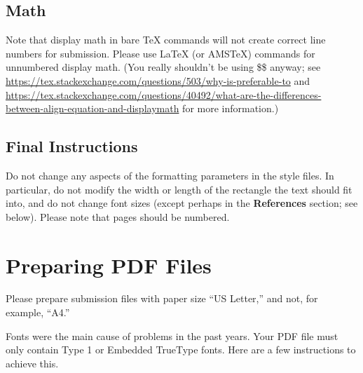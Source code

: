 \documentclass{article}
\begin{document}
\subsection{Math}
Note that display math in bare TeX commands will not create correct line numbers for submission. Please use LaTeX (or AMSTeX) commands for unnumbered display math. (You really shouldn't be using \$\$ anyway; see \url{https://tex.stackexchange.com/questions/503/why-is-preferable-to} and \url{https://tex.stackexchange.com/questions/40492/what-are-the-differences-between-align-equation-and-displaymath} for more information.)

\subsection{Final Instructions}

Do not change any aspects of the formatting parameters in the style files.  In particular, do not modify the width or length of the rectangle the text should fit into, and do not change font sizes (except perhaps in the \textbf{References} section; see below). Please note that pages should be numbered.

\section{Preparing PDF Files}

Please prepare submission files with paper size ``US Letter,'' and not, for example, ``A4.''

Fonts were the main cause of problems in the past years. Your PDF file must only contain Type 1 or Embedded TrueType fonts. Here are a few instructions to achieve this.
\end{document}
